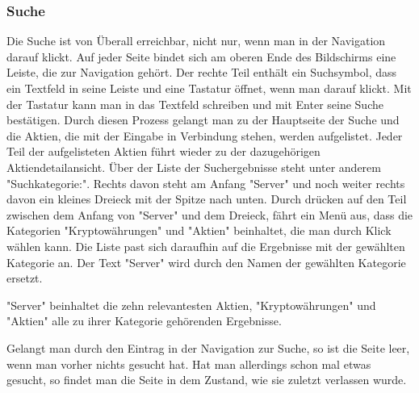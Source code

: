 \documentclass[10pt]{scrartcl}
\begin{document}
\subsubsection{Suche}
Die Suche ist von Überall erreichbar, nicht nur, wenn man in der Navigation darauf klickt. Auf jeder Seite bindet sich am oberen Ende des Bildschirms eine Leiste, die zur Navigation gehört. Der rechte Teil enthält ein Suchsymbol, dass ein Textfeld in seine Leiste und eine Tastatur öffnet, wenn man darauf klickt. Mit der Tastatur kann man in das Textfeld schreiben und mit Enter seine Suche bestätigen. Durch diesen Prozess gelangt man zu der Hauptseite der Suche und die Aktien, die mit der Eingabe in Verbindung stehen, werden aufgelistet. Jeder Teil der aufgelisteten Aktien führt wieder zu der dazugehörigen Aktiendetailansicht. Über der Liste der Suchergebnisse steht unter anderem "Suchkategorie:". Rechts davon steht am Anfang "Server" und noch weiter rechts davon ein kleines Dreieck mit der Spitze nach unten. Durch drücken auf den Teil zwischen dem Anfang von "Server" und dem Dreieck, fährt ein Menü aus, dass die Kategorien "Kryptowährungen" und "Aktien" beinhaltet, die man durch Klick wählen kann. Die Liste past sich daraufhin auf die Ergebnisse mit der gewählten Kategorie an. Der Text "Server" wird durch den Namen der gewählten Kategorie ersetzt.

"Server" beinhaltet die zehn relevantesten Aktien, "Kryptowährungen" und "Aktien" alle zu ihrer Kategorie gehörenden Ergebnisse.

Gelangt man durch den Eintrag in der Navigation zur Suche, so ist die Seite leer, wenn man vorher nichts gesucht hat. Hat man allerdings schon mal etwas gesucht, so findet man die Seite in dem Zustand, wie sie zuletzt verlassen wurde.
\end{document}
